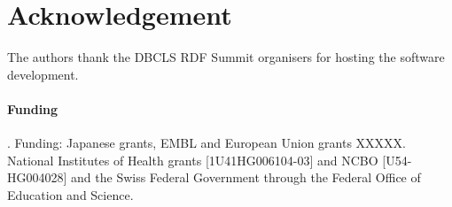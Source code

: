\documentclass{bioinfo}
\begin{document}
\section*{Acknowledgement}

The authors thank the DBCLS RDF Summit organisers for hosting the software development.

\paragraph{Funding\textcolon}.
Funding: Japanese grants, EMBL and European Union grants XXXXX. National Institutes of Health grants [1U41HG006104-03] and NCBO [U54-HG004028] and the Swiss Federal Government through the Federal Office of Education and Science.  


%
%
%
%
%
%
%
%
  
\end{document}

